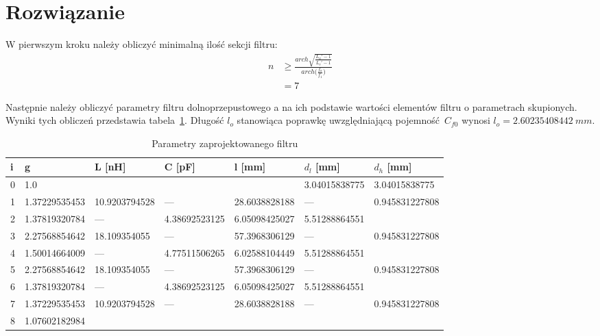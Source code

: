 \documentclass[rep.tex]{subfiles}
\begin{document}
\section{Rozwiązanie}
W pierwszym kroku należy obliczyć minimalną ilość sekcji filtru:
\begin{align}
  n &\geq \frac{arch \sqrt{\frac{L_a' - 1}{L_r' - 1}}}{arch \Big(\frac{f_a}{f_1}\Big)} \\
  &= 7 \nonumber
\end{align}

Następnie należy obliczyć parametry filtru dolnoprzepustowego a na ich podstawie wartości elementów filtru o parametrach skupionych.
Wyniki tych obliczeń przedstawia tabela~\ref{tab:zad16:params}.
Długość $l_o$ stanowiąca poprawkę uwzględniającą pojemność~$C_{f0}$ wynosi $l_o = 2.60235408442~mm$.

\begin{table}
  \centering
  \caption{Parametry zaprojektowanego filtru}
  \label{tab:zad16:params}
  \begin{tabular}{l l l l l l l}
    \hline\hline
    i & g & L [nH] & C [pF] & l [mm] & $d_l$ [mm] & $d_h$ [mm]\\
    \hline
    0 & 1.0           &               &               &               & 3.04015838775 & 3.04015838775 \\
    1 & 1.37229535453 & 10.9203794528 & ---           & 28.6038828188 & ---           & 0.945831227808 \\
    2 & 1.37819320784 & ---           & 4.38692523125 & 6.05098425027 & 5.51288864551 & \\
    3 & 2.27568854642 & 18.109354055  & ---           & 57.3968306129 & ---           & 0.945831227808 \\
    4 & 1.50014664009 & ---           & 4.77511506265 & 6.02588104449 & 5.51288864551 &\\
    5 & 2.27568854642 & 18.109354055  & ---           & 57.3968306129 & ---           & 0.945831227808 \\
    6 & 1.37819320784 & ---           & 4.38692523125 & 6.05098425027 & 5.51288864551 &\\
    7 & 1.37229535453 & 10.9203794528 & ---           & 28.6038828188 & ---           & 0.945831227808 \\
    8 & 1.07602182984 & \\
    \hline\hline
  \end{tabular}
\end{table}
\end{document}
